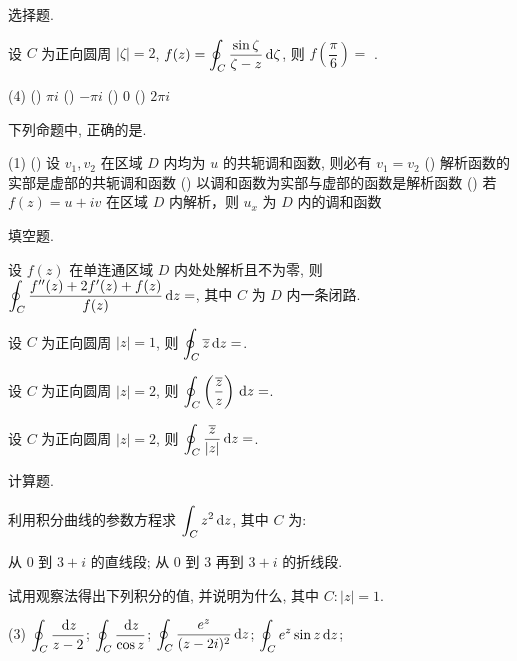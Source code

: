 \begin{homework}
	\item 选择题. \begin{exlist}
		\item 设 $C$ 为正向圆周 $|\zeta|=2$, $\displaystyle f(z)=\oint_C\frac{\sin \zeta}{\zeta-z}\,\mathrm{d} \zeta$, 则 $f\left(\dfrac\pi6\right)=$ \fillbrace{}.
			\begin{taskschoice}(4)
				() $\pi i$
				() $-\pi i$
				() $0$
				() $2\pi i$
			\end{taskschoice}
		\item 下列命题中, 正确的是\fillbrace{}.
			\begin{taskschoice}(1)
				() 设 $v_1,v_2$ 在区域 $D$ 内均为 $u$ 的共轭调和函数, 则必有 $v_1=v_2$
				() 解析函数的实部是虚部的共轭调和函数
				() 以调和函数为实部与虚部的函数是解析函数
				() 若 $f(z)=u+iv$ 在区域 $D$ 内解析，则 $u_x$ 为 $D$ 内的调和函数
		\end{taskschoice}
	\end{exlist}
	\item 填空题. \begin{exlist}
		\item 设 $f(z)$ 在单连通区域 $D$ 内处处解析且不为零, 则 $\displaystyle\oint_C\frac{f''(z)+2f'(z)+f(z)}{f(z)}\,\mathrm{d} z=$\fillblank{}, 其中 $C$ 为 $D$ 内一条闭路.
		\item 设 $C$ 为正向圆周 $|z|=1$, 则 $\displaystyle\oint_C\overline z\,\mathrm{d} z=$\fillblank{}.
		\item 设 $C$ 为正向圆周 $|z|=2$, 则 $\displaystyle\oint_C\left(\frac{\overline z}{z}\right)\,\mathrm{d} z=$\fillblank{}.
		\item 设 $C$ 为正向圆周 $|z|=2$, 则 $\displaystyle\oint_C\dfrac{\overline z}{|z|}\,\mathrm{d} z=$\fillblank{}.
	\end{exlist}
	\item 计算题.
	\begin{exlist}
		\item 利用积分曲线的参数方程求 $\displaystyle\int_C z^2\,\mathrm{d} z$, 其中 $C$ 为:
			\begin{tasks}
				\task 从 $0$ 到 $3+i$ 的直线段;
				\task 从 $0$ 到 $3$ 再到 $3+i$ 的折线段.
			\end{tasks}
		\item 试用观察法得出下列积分的值, 并说明为什么, 其中 $C:|z|=1$.
			\begin{tasks}(3)
				\task $\displaystyle\oint_C\frac{\,\mathrm{d} z}{z-2}$;
				\task $\displaystyle\oint_C\frac{\,\mathrm{d} z}{\cos z}$;
				\task $\displaystyle\oint_C\frac{e^z}{(z-2i)^2}\,\mathrm{d} z$;
				\task $\displaystyle\oint_Ce^z\sin z\,\mathrm{d} z$;

\end{tasks}
\end{exlist}
\end{homework}
